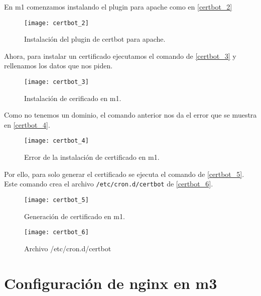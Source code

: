 En m1 comenzamos instalando el plugin para apache como en \eqref{certbot_2}

\begin{figure}[h!]
\begin{center}
\caption{Instalación del plugin de certbot para apache.}
\label{certbot_2}
\texttt{[image: certbot\_2]}
\end{center}
\end{figure}

Ahora, para instalar un certificado ejecutamos el comando de \eqref{certbot_3} y rellenamos los datos que nos piden.

\begin{figure}[h!]
\begin{center}
\caption{Instalación de cerificado en m1.}
\label{certbot_3}
\texttt{[image: certbot\_3]}
\end{center}
\end{figure}

Como no tenemos un dominio, el comando anterior nos da el error que se muestra en \eqref{certbot_4}.

\begin{figure}[h!]
\begin{center}
\caption{Error de la instalación de certificado en m1.}
\label{certbot_4}
\texttt{[image: certbot\_4]}
\end{center}
\end{figure}

Por ello, para solo generar el certificado se ejecuta el comando de \eqref{certbot_5}. Este comando crea el archivo \verb|/etc/cron.d/certbot| de \eqref{certbot_6}.

\begin{figure}[h!]
\begin{center}
\caption{Generación de certificado en m1.}
\label{certbot_5}
\texttt{[image: certbot\_5]}
\end{center}
\end{figure}

\begin{figure}[h!]
\begin{center}
\caption{Archivo /etc/cron.d/certbot}
\label{certbot_6}
\texttt{[image: certbot\_6]}
\end{center}
\end{figure}

\section{Configuración de nginx en m3}

